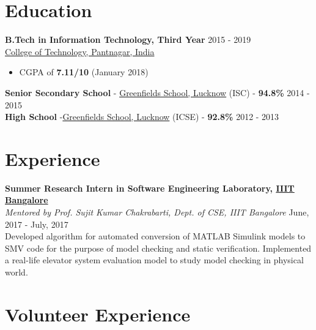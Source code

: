 \documentclass[margin, centered]{res}
\begin{document}
\begin{resume}

\section{Education}
\textbf{B.Tech in Information Technology, Third Year} \hfill 2015 - 2019 \\
\href{http://gbpuat-tech.ac.in}{College of Technology, Pantnagar, India}
\begin{itemize}
 \item CGPA of {\textbf{{7.11}/10}} (January 2018)
\end{itemize}
\textbf{Senior Secondary School} - \href{http://www.greenfieldsschool.org.in/}{Greenfields School, Lucknow} (ISC) - \textbf{94.8\% }\hfill 2014 - 2015 \\
\textbf{High School} -\href{http://www.greenfieldsschool.org.in/} {Greenfields School, Lucknow} (ICSE) - \textbf{92.8\%} \hfill 2012 - 2013


\section{Experience}


\textbf{Summer Research Intern in Software Engineering Laboratory, \href{https://www.iiitb.ac.in}{IIIT Bangalore}} \\
\emph{Mentored by Prof. Sujit Kumar Chakrabarti, Dept. of CSE, IIIT Bangalore} \hfill June, 2017 - July, 2017 \\
Developed algorithm for automated conversion of MATLAB Simulink models to SMV code for the purpose of model checking and static verification. Implemented a real-life elevator system evaluation model to study model checking in physical world.\


\section{Volunteer Experience}



\end{resume}
\end{document}
